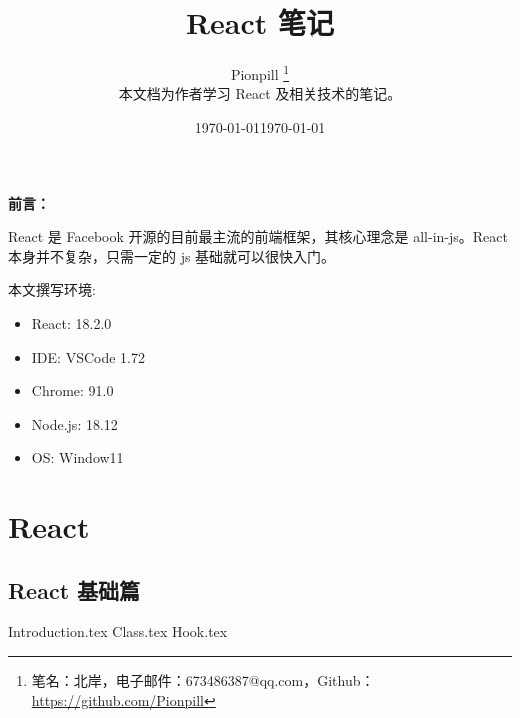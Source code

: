 \documentclass{PionpillNote-book}
\title{React 笔记}
\author{
    Pionpill \footnote{笔名：北岸，电子邮件：673486387@qq.com，Github：\url{https://github.com/Pionpill}} \\
    本文档为作者学习 React 及相关技术的笔记。\\
}
\date{\today}
\begin{document}
\pagestyle{plain}
\maketitle

\noindent\textbf{前言：}

React 是 Facebook 开源的目前最主流的前端框架，其核心理念是 all-in-js。React 本身并不复杂，只需一定的 js 基础就可以很快入门。

本文撰写环境:

\begin{itemize}
    \item React: 18.2.0
    \item IDE: VSCode 1.72 
    \item Chrome: 91.0
    \item Node.js: 18.12
    \item OS: Window11
\end{itemize}

\date{\today}
\newpage

\tableofcontents

\newpage

\setcounter{page}{1} 
\pagestyle{fancy}

\part{React}
\chapter{React 基础篇}
{Introduction.tex}
{Class.tex}
{Hook.tex}
\end{document}
